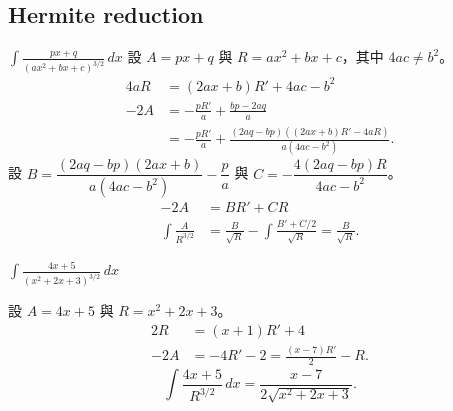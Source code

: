 \documentclass{beamer}
\theoremstyle{remark}
\begin{document}
\begin{CJK}{UTF8}{bsmi}
\subsection[Hermite red.]{Hermite reduction}

\begin{frame}{$\displaystyle \int \frac{px + q}{\left( ax^2 + bx + c \right)^{3/2}}\,dx$}
  設 $A = px + q$ 與 $R = ax^2 + bx + c$，其中 $4ac \ne b^2$。
  \begin{align*}
    4aR &= \left( 2ax + b \right) R' + 4ac - b^2\\
    -2A &= -\frac{pR'}{a} + \frac{bp - 2aq}{a}\\
	&= -\frac{pR'}{a} + \frac{\left( 2aq - bp \right) \left( \left( 2ax + b \right) R' - 4aR \right)}
	   {a \left( 4ac - b^2 \right)}.
  \end{align*}
  設 $B = \dfrac{\left( 2aq - bp \right) \left( 2ax + b \right)}{a \left( 4ac - b^2 \right)} - \dfrac p a$ 與
  $C = -\dfrac{4 \left( 2aq - bp \right) R}{4ac - b^2}$。
  \begin{align*}
    -2A &= BR' + CR\\
    \int \frac{A}{R^{3/2}} &= \frac{B}{\sqrt R} - \int \frac{B' + C/2}{\sqrt R} = \frac{B}{\sqrt R}.
  \end{align*}
\end{frame}

\begin{frame}{$\displaystyle \int \frac{4x + 5}{\left( x^2 + 2x + 3 \right)^{3/2}}\,dx$}
  \begin{solution}
    設 $A = 4x + 5$ 與 $R = x^2 + 2x + 3$。
    \begin{align*}
       2R &= \left( x + 1 \right) R' + 4\\
      -2A &= -4R' - 2 = \frac{\left( x - 7 \right) R'}{2} - R.
    \end{align*}
    \[\int \frac{4x + 5}{R^{3/2}}\,dx = \frac{x - 7}{2 \sqrt{x^2 + 2x + 3}}.\]
  \end{solution}
\end{frame}


\end{CJK}
\end{document}
